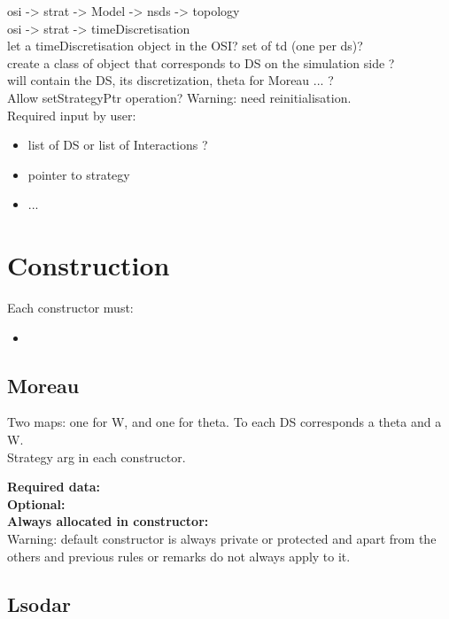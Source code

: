 \documentclass[10pt]{report}
\begin{document}
osi -> strat -> Model -> nsds -> topology \\
osi -> strat -> timeDiscretisation \\

let a timeDiscretisation object in the OSI? set of td (one per ds)? \\
create a class of object that corresponds to DS on the simulation side ? \\
will contain the DS, its discretization, theta for Moreau ... ? \\
Allow setStrategyPtr operation? Warning: need reinitialisation. \\


Required input by user: \\
\begin{itemize}
\item list of DS or list of Interactions ?
\item pointer to strategy
\item ...
\end{itemize}

\section{Construction}

Each constructor must:

\begin{itemize}
\item
\end{itemize}

\subsection{Moreau}

Two maps: one for W, and one for theta. To each DS corresponds a theta and a W. \\
Strategy arg in each constructor.

\textbf{Required data:}\\

\textbf{Optional:}\\

\textbf{Always allocated in constructor:} \\

Warning: default constructor is always private or protected and apart from the others and previous rules or remarks do not always apply to it.

\subsection{Lsodar}
\end{document}
